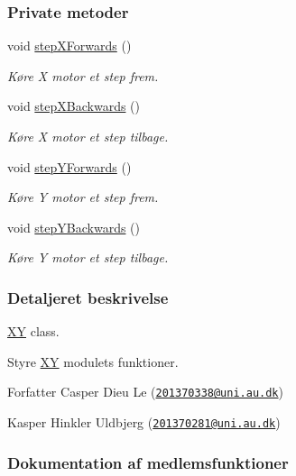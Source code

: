 \subsubsection*{Private metoder}
\begin{DoxyCompactItemize}
\item 
void \hyperlink{class_x_y_a77f23b16c6fae141a892ed476b325184}{step\+X\+Forwards} ()
\begin{DoxyCompactList}\small\item\em Køre X motor et step frem. \end{DoxyCompactList}\item 
void \hyperlink{class_x_y_a30e07320705aa878e1f5a1b959eba099}{step\+X\+Backwards} ()
\begin{DoxyCompactList}\small\item\em Køre X motor et step tilbage. \end{DoxyCompactList}\item 
void \hyperlink{class_x_y_aee60e222d7c603de314c886d5e922a53}{step\+Y\+Forwards} ()
\begin{DoxyCompactList}\small\item\em Køre Y motor et step frem. \end{DoxyCompactList}\item 
void \hyperlink{class_x_y_aea96dacda1955992c5436dcb829daa26}{step\+Y\+Backwards} ()
\begin{DoxyCompactList}\small\item\em Køre Y motor et step tilbage. \end{DoxyCompactList}\end{DoxyCompactItemize}


\subsubsection{Detaljeret beskrivelse}
\hyperlink{class_x_y}{XY} class. 

Styre \hyperlink{class_x_y}{XY} modulets funktioner. \begin{DoxyAuthor}{Forfatter}
Casper Dieu Le (\href{mailto:201370338@uni.au.dk}{\tt 201370338@uni.\+au.\+dk}) 

Kasper Hinkler Uldbjerg (\href{mailto:201370281@uni.au.dk}{\tt 201370281@uni.\+au.\+dk}) 
\end{DoxyAuthor}


\subsubsection{Dokumentation af medlemsfunktioner}
